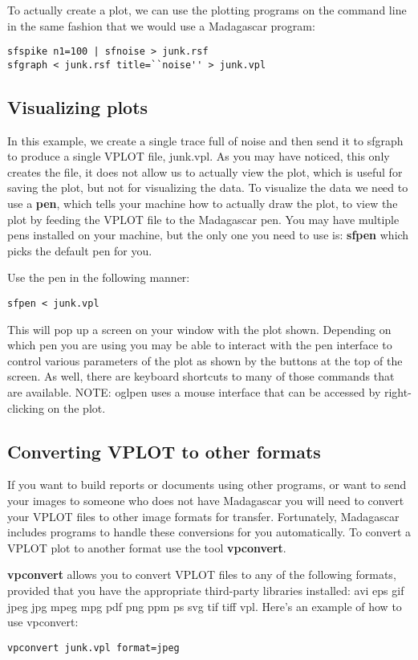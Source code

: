 To actually create a plot, we can use the plotting programs on the command line in the same fashion that we would use a Madagascar program:
\begin{verbatim}
sfspike n1=100 | sfnoise > junk.rsf
sfgraph < junk.rsf title=``noise'' > junk.vpl
\end{verbatim}
\subsection{Visualizing plots}

    In this example, we create a single trace full of noise and then send it to sfgraph to produce a single VPLOT file, junk.vpl.  As you may have noticed, this only creates the file, it does not allow us to actually view the plot, which is useful for saving the plot, but not for visualizing the data.  To visualize the data we need to use a \textbf{pen}, which tells your machine how to actually draw the plot, to view the plot by feeding the VPLOT file to the Madagascar pen. You may have multiple pens installed on your machine, but the only one you need to use is: \textbf{sfpen} which picks the default pen for you.

Use the pen in the following manner:
\begin{verbatim}
sfpen < junk.vpl
\end{verbatim}
This will pop up a screen on your window with the plot shown.  Depending on which pen you are using you may be able to interact with the pen interface to control various parameters of the plot as shown by the buttons at the top of the screen.  As well, there are keyboard shortcuts to many of those commands that are available.  NOTE: oglpen uses a mouse interface that can be accessed by right-clicking on the plot.

\subsection{Converting VPLOT to other formats}

If you want to build reports or documents using other programs, or want to send your images to someone who does not have Madagascar you will need to convert your VPLOT files to other image formats for transfer.  Fortunately, Madagascar includes programs to handle these conversions for you automatically.  To convert a VPLOT plot to another format use the tool \textbf{vpconvert}.  

\textbf{vpconvert} allows you to convert VPLOT files to any of the following formats, provided that you have the appropriate third-party libraries installed: avi eps gif jpeg jpg mpeg mpg pdf png ppm ps svg tif tiff vpl.  Here's an example of how to use vpconvert:
\begin{verbatim}
vpconvert junk.vpl format=jpeg
\end{verbatim}

